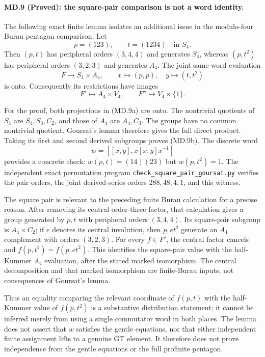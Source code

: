 \paragraph{MD.9 (Proved): the square-pair comparison is not a word identity.}
The following exact finite lemma isolates an additional issue in
the modulo-four Burau pentagon comparison. Let
\[
 p=(123),\qquad t=(1234)\quad\text{in }S_4.
\]
Then $(p,t)$ has peripheral orders $(3,4,4)$ and generates $S_4$,
whereas $(p,t^2)$ has peripheral orders $(3,2,3)$ and generates
$A_4$. The joint same-word evaluation
\[
 F\longrightarrow S_4\times A_4,
 \qquad x\longmapsto(p,p),\quad y\longmapsto(t,t^2)
 \tag{MD.9a}
\]
is onto. Consequently its restrictions have images
\[
 F'\longmapsto A_4\times V_4,
 \qquad F''\longmapsto V_4\times\{1\}.
 \tag{MD.9b}
\]

For the proof, both projections in (MD.9a) are onto. The nontrivial
quotients of $S_4$ are $S_4,S_3,C_2$, and those of $A_4$ are
$A_4,C_3$. The groups have no common nontrivial quotient.
Goursat's lemma therefore gives the full direct product.
Taking its first and second derived subgroups proves (MD.9b).
The discrete word
\[
 w=[[x,y],x[x,y]x^{-1}]
\]
provides a concrete check: $w(p,t)=(14)(23)$ but
$w(p,t^2)=1$. The independent exact permutation program
\texttt{check\_square\_pair\_goursat.py} verifies the pair orders,
the joint derived-series orders $288,48,4,1$, and this witness.

The square pair is relevant to the preceding finite Burau
calculation for a precise reason. After removing its central
order-three factor, that calculation gives a group generated by
$p,t$ with peripheral orders $(3,4,4)$. Its square-pair subgroup
is $A_4\times C_2$; if $e$ denotes its central involution, then
$p,et^2$ generate an $A_4$ complement with orders $(3,2,3)$.
For every $f\in F'$, the central factor cancels and
$f(p,t^2)=f(p,et^2)$. This identifies the square-pair value with
the half-Kummer $A_4$ evaluation, after the stated marked
isomorphism. The central decomposition and that marked
isomorphism are finite-Burau inputs, not consequences of
Goursat's lemma.

Thus an equality comparing the relevant coordinate of $f(p,t)$
with the half-Kummer value of $f(p,t^2)$ is a substantive
distribution statement; it cannot be inferred merely from
using a single commutator word in both places. The lemma does
not assert that $w$ satisfies the gentle equations, nor that
either independent finite assignment lifts to a genuine GT
element. It therefore does not prove independence from the
gentle equations or the full profinite pentagon.

